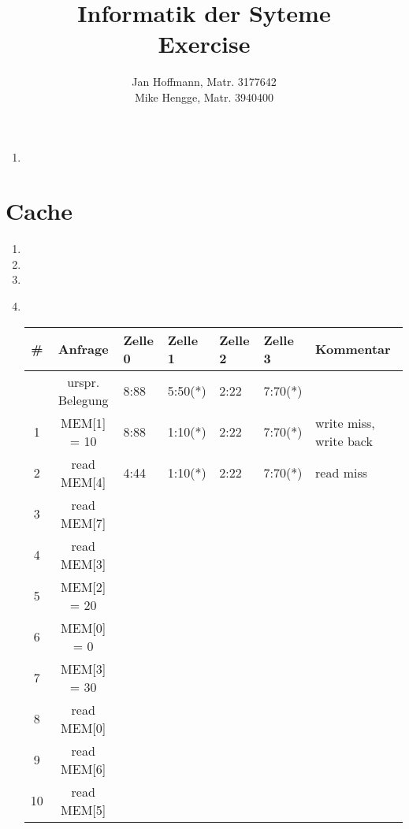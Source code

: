 \documentclass[10pt,a4paper,landscape]{article}
\title{Informatik der Syteme \\ Exercise \exnum}
\author{Jan Hoffmann, Matr. 3177642 \\ Mike Hengge,  Matr. 3940400}
\begin{document}
\section{}\label{sec:10.1}
	\begin{enumerate}
		\item
	\end{enumerate}

\section{Cache}\label{sec:10.2}
	\begin{enumerate}
		\item
		\item
		\item
		\item \text{}\\
			\begin{tabular}{cc|lllll}
				\# & Anfrage         & Zelle 0 & Zelle 1 & Zelle 2 & Zelle 3 & Kommentar              \\ \hline
				   & urspr. Belegung & 8:88    & 5:50(*) & 2:22    & 7:70(*) &                        \\
				 1 & MEM[1] = 10     & 8:88    & 1:10(*) & 2:22    & 7:70(*) & write miss, write back \\
				 2 & read MEM[4]     & 4:44    & 1:10(*) & 2:22    & 7:70(*) & read miss              \\
				 3 & read MEM[7]     &         &         &         &         &                        \\ 
				 4 & read MEM[3]     &         &         &         &         &                        \\ 
				 5 & MEM[2] = 20     &         &         &         &         &                        \\
				 6 & MEM[0] = 0      &         &         &         &         &                        \\ 
				 7 & MEM[3] = 30     &         &         &         &         &                        \\ 
				 8 & read MEM[0]     &         &         &         &         &                        \\ 
				 9 & read MEM[6]     &         &         &         &         &                        \\ 
				10 & read MEM[5]     &         &         &         &         &                        \\ 
			\end{tabular}
	\end{enumerate}
			
\end{document}
